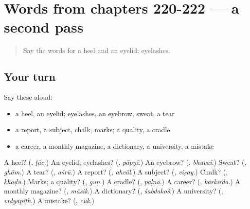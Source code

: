 \section[(dialogue)]{Words from chapters 220-222 — a second pass}

\label{lesson:MR-R222-second-pass-words-from-chapters-220-222}



\begin{quote}
Say the words for a heel and an eyelid; eyelashes.
\end{quote}

\subsection*{Your turn}
Say these aloud:

\begin{itemize}
\raggedright
  \item a heel, an eyelid; eyelashes, an eyebrow, sweat, a tear
  \item a report, a subject, chalk, marks; a quality, a cradle
  \item a career, a monthly magazine, a dictionary, a university, a mistake
\end{itemize}

\begin{tcolorbox}[breakable,colback=teal!4,colframe=teal!35!black,title={Before you move on}]
A heel? (\textbf{}, \emph{ṭāc}.) An eyelid; eyelashes? (\textbf{}, \emph{pāpṇī}.) An eyebrow? (\textbf{}, \emph{bhuvaī}.) Sweat? (\textbf{}, \emph{ghām}.) A tear? (\textbf{}, \emph{aśrū}.) A report? (\textbf{}, \emph{ahvāl}.) A subject? (\textbf{}, \emph{viṣay}.) Chalk? (\textbf{}, \emph{khaḍū}.) Marks; a quality? (\textbf{}, \emph{guṇ}.) A cradle? (\textbf{}, \emph{pāḷṇā}.) A career? (\textbf{}, \emph{kārkīrda}.) A monthly magazine? (\textbf{}, \emph{māsik}.) A dictionary? (\textbf{}, \emph{śabdakoś}.) A university? (\textbf{}, \emph{vidyāpīṭh}.) A mistake? (\textbf{}, \emph{cūk}.)
\end{tcolorbox}
